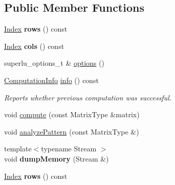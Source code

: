 \subsection*{Public Member Functions}
\begin{DoxyCompactItemize}
\item 
\mbox{\label{class_eigen_1_1_super_l_u_base_a385c6d2d55f024034a02c45f66a88429}} 
\hyperlink{namespace_eigen_a62e77e0933482dafde8fe197d9a2cfde}{Index} {\bfseries rows} () const
\item 
\mbox{\label{class_eigen_1_1_super_l_u_base_a534fb98155d507aaa512032b32064444}} 
\hyperlink{namespace_eigen_a62e77e0933482dafde8fe197d9a2cfde}{Index} {\bfseries cols} () const
\item 
superlu\+\_\+options\+\_\+t \& \hyperlink{class_eigen_1_1_super_l_u_base_a42d9d79073379f1e75b0f2c49879ed5b}{options} ()
\item 
\hyperlink{group__enums_ga85fad7b87587764e5cf6b513a9e0ee5e}{Computation\+Info} \hyperlink{class_eigen_1_1_super_l_u_base_aa67da5c8c24110931c949c5896c5ec03}{info} () const
\begin{DoxyCompactList}\small\item\em Reports whether previous computation was successful. \end{DoxyCompactList}\item 
void \hyperlink{class_eigen_1_1_super_l_u_base_a28cb3ef7914ecb6fdae1935b53f6be40}{compute} (const Matrix\+Type \&matrix)
\item 
void \hyperlink{class_eigen_1_1_super_l_u_base_a2d3f48425328d9b3cbdca369889007f3}{analyze\+Pattern} (const Matrix\+Type \&)
\item 
\mbox{\label{class_eigen_1_1_super_l_u_base_a238acfa9eecf87b8e20d2aa4bba64ae5}} 
{\footnotesize template$<$typename Stream $>$ }\\void {\bfseries dump\+Memory} (Stream \&)
\item 
\mbox{\label{class_eigen_1_1_super_l_u_base_a385c6d2d55f024034a02c45f66a88429}} 
\hyperlink{namespace_eigen_a62e77e0933482dafde8fe197d9a2cfde}{Index} {\bfseries rows} () const
\item 
\mbox{\label{class_eigen_1_1_super_l_u_base_a534fb98155d507aaa512032b32064444}} 

\end{DoxyCompactItemize}
